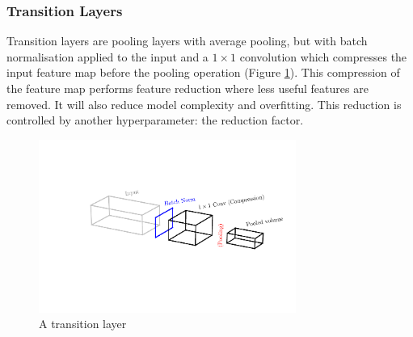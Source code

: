 \subsubsection{Transition Layers}
Transition layers are pooling layers with average pooling, but with batch normalisation applied to the input and a $1\times{}1$ convolution which compresses the input feature map before the pooling operation (Figure \ref{fig:machine_learning:transition_layer}). 
This compression of the feature map performs feature reduction where less useful features are removed. It will also reduce model complexity and overfitting. This reduction is controlled by another hyperparameter: the reduction factor. 
\begin{figure}[h!]
    \includegraphics[width=0.75\textwidth]{figures/machine_learning/transition_layer.pdf}
    \caption{A transition layer}
        \label{fig:machine_learning:transition_layer}
\end{figure}






